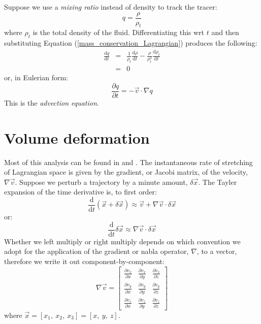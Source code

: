 \documentclass[11pt]{article}
\begin{document}
Suppose we use a {\it mixing ratio} instead of density to track the
tracer:
\begin{equation}
	q = \frac {\rho}{\rho_t} \label{mixing_ratio}
\end{equation}
where $\rho_t$ is the total density of the fluid.  Differentiating this wrt
$t$ and then substituting Equation (\ref{mass_conservation_Lagrangian})
produces the following:
\begin{eqnarray}
\frac{\mathrm d q}{\mathrm d t} & = & \frac{1}{\rho_t} \frac{\mathrm d \rho}{\mathrm d t}
	- \frac{\rho}{\rho_t^2}\frac{\mathrm d \rho_t}{\mathrm d t}\\
& = & 0
\end{eqnarray}
or, in Eulerian form:
\begin{equation}
\frac{\partial q}{\partial t} = - \vec v \cdot \nabla q
\label{advection_eqn}
\end{equation}
This is the {\it advection equation}.

\section{Volume deformation}

\label{deformation_section}

Most of this analysis can be found in \citet{Pattanayak2001} and 
\citet{Mills2004}. 
The instantaneous rate of stretching of Lagrangian space is given by the
gradient, or Jacobi matrix, of the velocity, $\nabla \vec v$.
Suppose we perturb a trajectory by a minute amount, $\delta \vec x$.
The Tayler expansion of the time derivative is, to first order:
\begin{equation}
\frac{\mathrm d}{\mathrm d t} (\vec x + \delta \vec x) \approx
\vec v + \nabla \vec v \cdot \delta \vec x \label{taylor_expansion}
\end{equation}
or:
\begin{equation}
\frac{\mathrm d}{\mathrm d t}\delta \vec x \approx \nabla \vec v \cdot \delta \vec x
\label{evolution_error_vector}
\end{equation}
Whether we left multiply or right multiply depends on which convention we adopt
for the application of the gradient or nabla operator, $\nabla$, to a vector,
therefore we write it out component-by-component:
\begin{equation}
\nabla \vec v = \left [
\begin{array}{ccc}
\frac{\partial v_x}{\partial x} & \frac{\partial v_x}{\partial y} & \frac{\partial v_x}{\partial z} \\
\frac{\partial v_y}{\partial x} & \frac{\partial v_y}{\partial y} & \frac{\partial v_y}{\partial z} \\
\frac{\partial v_z}{\partial x} & \frac{\partial v_z}{\partial y} & \frac{\partial v_z}{\partial z}
\end{array} \right ]
\end{equation}
where $\vec x=[x_1,~x_2,~x_3]=[x,~y,~z]$.
\end{document}
